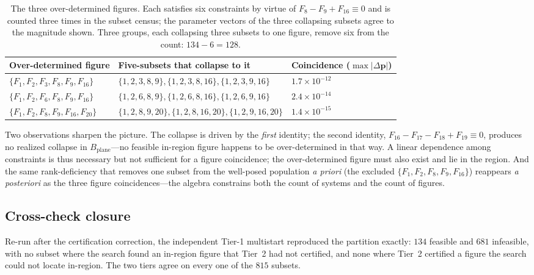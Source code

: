 \documentclass[11pt]{article}
\newcommand{\Bplane}{B_{\mathrm{plane}}}
\begin{document}
\begin{table}[h]
\centering
\small
\setlength{\tabcolsep}{3pt}
\begin{tabular}{lll}
\toprule
Over-determined figure & Five-subsets that collapse to it & Coincidence ($\max|\Delta\mathbf{p}|$)\\
\midrule
$\{F_1,F_2,F_3,F_8,F_9,F_{16}\}$ & $\{1,2,3,8,9\},\{1,2,3,8,16\},\{1,2,3,9,16\}$ & $1.7\times10^{-12}$\\
$\{F_1,F_2,F_6,F_8,F_9,F_{16}\}$ & $\{1,2,6,8,9\},\{1,2,6,8,16\},\{1,2,6,9,16\}$ & $2.4\times10^{-14}$\\
$\{F_1,F_2,F_8,F_9,F_{16},F_{20}\}$ & $\{1,2,8,9,20\},\{1,2,8,16,20\},\{1,2,9,16,20\}$ & $1.4\times10^{-15}$\\
\bottomrule
\end{tabular}
\caption{The three over-determined figures. Each satisfies six constraints by virtue of $F_8-F_9+F_{16}\equiv0$ and is counted three times in the subset census; the parameter vectors of the three collapsing subsets agree to the magnitude shown. Three groups, each collapsing three subsets to one figure, remove six from the count: $134-6=128$.}
\label{tab:overdet}
\end{table}

Two observations sharpen the picture. The collapse is driven by the \emph{first} identity; the second identity, $F_{16}-F_{17}-F_{18}+F_{19}\equiv0$, produces no realized collapse in $\Bplane$---no feasible in-region figure happens to be over-determined in that way. A linear dependence among constraints is thus necessary but not sufficient for a figure coincidence; the over-determined figure must also exist and lie in the region. And the same rank-deficiency that removes one subset from the well-posed population \emph{a priori} (the excluded $\{F_1,F_2,F_8,F_9,F_{16}\}$) reappears \emph{a posteriori} as the three figure coincidences---the algebra constrains both the count of systems and the count of figures.

\subsection{Cross-check closure}

Re-run after the certification correction, the independent Tier-1 multistart reproduced the partition exactly: $134$ feasible and $681$ infeasible, with no subset where the search found an in-region figure that Tier~2 had not certified, and none where Tier~2 certified a figure the search could not locate in-region. The two tiers agree on every one of the $815$ subsets.
\end{document}

